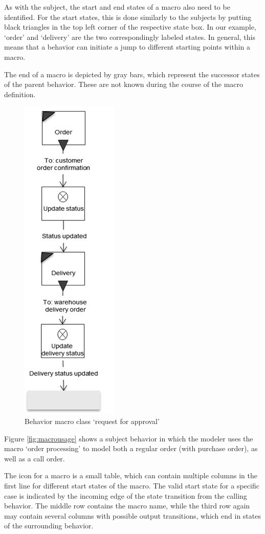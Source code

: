 As with the subject, the start and end states of a macro also need to be identified. For the start states, this is done similarly to the subjects by putting black triangles in the top left corner of the respective state box. In our example, ‘order’ and ‘delivery’ are the two correspondingly labeled states. In general, this means that a behavior can initiate a jump to different starting points within a macro.

The end of a macro is depicted by gray bars, which represent the successor states of the parent behavior. These are not known during the course of the macro definition.

\begin{figure}[ph]
	\centering
	\includegraphics[width=0.2\linewidth]{20181026-Ontologie-Bilder/Grafiken-Ontologie/SUbjectExecution/MacroBehavior}
	\caption[Behavior macro class ‘request for approval’]{Behavior macro class ‘request for approval’}
	\label{fig:macrobehavior}
\end{figure}

Figure \ref{fig:macrousage} shows a subject behavior in which the modeler uses the macro ‘order processing’ to model both a regular order (with purchase order), as well as a call order.

The icon for a macro is a small table, which can contain multiple columns in the first line for different start states of the macro. The valid start state for a specific case is indicated by the incoming edge of the state transition from the calling behavior. The middle row contains the macro name, while the third row again may contain several columns with possible output transitions, which end in states of the surrounding behavior.


